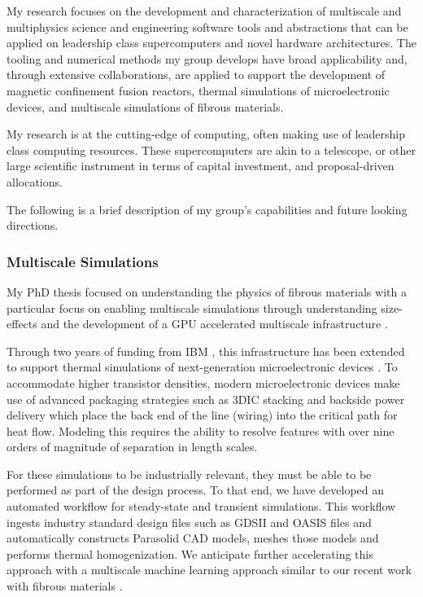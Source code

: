 My research focuses on the development and characterization of multiscale and multiphysics science and engineering software tools and abstractions that can be applied on leadership class supercomputers and novel hardware architectures. The tooling and numerical methods my group develops have broad applicability and, through extensive collaborations, are applied to support the development of magnetic confinement fusion reactors, thermal simulations of microelectronic devices, and multiscale simulations of fibrous materials.

My research is at the cutting-edge of computing, often making use of leadership class computing resources. These supercomputers are akin to a telescope, or other large scientific instrument in terms of capital investment, and proposal-driven allocations.

The following is a brief description of my group's capabilities and future looking directions.

\subsubsection{Multiscale Simulations}

My PhD thesis focused on understanding the physics of fibrous materials with a particular focus on enabling multiscale simulations through understanding size-effects and the development of a GPU accelerated multiscale infrastructure \cite{mersonSizeEffectsRandom2020,mersonNewOpensourceFramework2024}.

Through two years of funding from IBM \cite{IBMAIRC2023,IBMFCRC2024}, this infrastructure has been extended to support thermal simulations of next-generation microelectronic devices \cite{ithermModeling2025,mersonItherm2026}. To accommodate higher transistor densities, modern microelectronic devices make use of advanced packaging strategies such as 3DIC stacking and backside power delivery which place the back end of the line (wiring) into the critical path for heat flow. Modeling this requires the ability to resolve features with over nine orders of magnitude of separation in length scales.

For these simulations to be industrially relevant, they must be able to be performed as part of the design process. To that end, we have developed an automated workflow for steady-state \cite{ithermModeling2025} and transient \cite{mersonItherm2026} simulations. This workflow ingests industry standard design files such as GDSII and OASIS files and automatically constructs Parasolid CAD models, meshes those models and performs thermal homogenization. We anticipate further accelerating this approach with a multiscale machine learning approach similar to our recent work with fibrous materials \cite{parvezMachineLearningApproach2024}.

